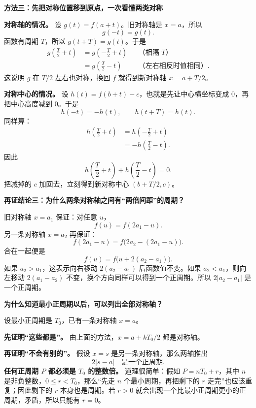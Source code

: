 \begin{proofbox}
\textbf{\textcolor{CProof}{方法三：先把对称位置移到原点，一次看懂两类对称}}



\textbf{对称轴的情况。} 设 $g(t)=f(a+t)$。旧对称轴是 $x=a$，所以
\[
g(-t)=g(t).
\]
函数有周期 $T$，所以 $g(t+T)=g(t)$。于是
\[
\begin{aligned}
g\left(\frac T2+t\right)
&=g\left(-\frac T2+t\right) &&\text{（相隔 $T$）}\\
&=g\left(\frac T2-t\right) &&\text{（左右相反时值相同）}.
\end{aligned}
\]
这说明 $g$ 在 $T/2$ 左右也对称，换回 $f$ 就得到新对称轴 $x=a+T/2$。

\textbf{对称中心的情况。} 设 $h(t)=f(b+t)-c$，也就是先让中心横坐标变成 $0$，再把中心高度减到 $0$。于是
\[
h(-t)=-h(t),\qquad h(t+T)=h(t).
\]
同样算：
\[
\begin{aligned}
h\left(\frac T2+t\right)
&=h\left(-\frac T2+t\right)\\
&=-h\left(\frac T2-t\right).
\end{aligned}
\]
因此
\[
h\left(\frac T2+t\right)+h\left(\frac T2-t\right)=0.
\]
把减掉的 $c$ 加回去，立刻得到新对称中心 $(b+T/2,c)$。

\medskip
\end{proofbox}\clearpage\begin{proofbox}\textbf{\textcolor{CProof}{再证结论三：为什么两条对称轴之间有“两倍间距”的周期？}}



旧对称轴 $x=a_1$ 保证：对任意 $u$，
\[
f(u)=f(2a_1-u).
\]
另一条对称轴 $x=a_2$ 再保证：
\[
f(2a_1-u)=f\bigl(2a_2-(2a_1-u)\bigr).
\]
合在一起便是
\[
\boxed{f(u)=f\bigl(u+2(a_2-a_1)\bigr)}.
\]
如果 $a_2>a_1$，这表示向右移动 $2(a_2-a_1)$ 后函数值不变。如果 $a_2<a_1$，则向左移动 $2(a_1-a_2)$ 不变，换个方向同样可以得到一个正周期。所以 $2|a_2-a_1|$ 是一个正周期。

\medskip
\end{proofbox}\clearpage\begin{proofbox}\textbf{\textcolor{CProof}{为什么知道最小正周期以后，可以列出全部对称轴？}}



设最小正周期是 $T_0$，已有一条对称轴 $x=a$。

\textbf{先证明“这些都是”。} 由上面的方法，$x=a+kT_0/2$ 都是对称轴。

\textbf{再证明“不会有别的”。} 假设 $x=s$ 是另一条对称轴，那么两轴推出
\[
2|s-a|\quad\text{是一个正周期}.
\]
\textbf{任何正周期 $P$ 都必须是 $T_0$ 的整数倍。} 道理很简单：假如 $P=nT_0+r$，其中 $n$ 是非负整数，$0\le r<T_0$，那么“先走 $n$ 个最小周期，再把剩下的 $r$ 走完”也应该重复；因此剩下的 $r$ 本身也是周期。若 $r>0$ 就会出现一个比最小正周期更小的正周期，矛盾，所以只能有 $r=0$。


\end{proofbox}
